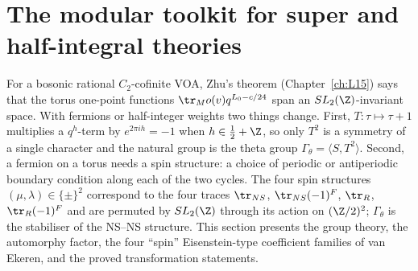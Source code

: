 \section{The modular toolkit for super and half-integral theories}\label{l17:sec:modularity}

For a bosonic rational $C_2$-cofinite VOA, Zhu's theorem (Chapter~\ref{ch:L15}) says that the torus
one-point functions $\tr_Mo(v)q^{L_0-c/24}$ span an $SL_2(\Z)$-invariant space. With fermions or
half-integer weights two things change. First, $T:\tau\mapsto\tau+1$ multiplies a $q^{h}$-term by
$e^{2\pi ih}=-1$ when $h\in\frac12+\Z$, so only $T^2$ is a symmetry of a single character and the
natural group is the theta group $\Gamma_\theta=\langle S,T^2\rangle$. Second, a fermion on a torus
needs a spin structure: a choice of periodic or antiperiodic boundary condition along each of the two
cycles. The four spin structures $(\mu,\lambda)\in\{\pm\}^2$ correspond to the four traces
$\tr_{NS}$, $\tr_{NS}(-1)^F$, $\tr_R$, $\tr_R(-1)^F$ and are permuted by $SL_2(\Z)$ through its
action on $(\Z/2)^2$; $\Gamma_\theta$ is the stabiliser of the NS--NS structure. This section presents
the group theory, the automorphy factor, the four ``spin'' Eisenstein-type coefficient families of
van Ekeren, and the proved transformation statements.

